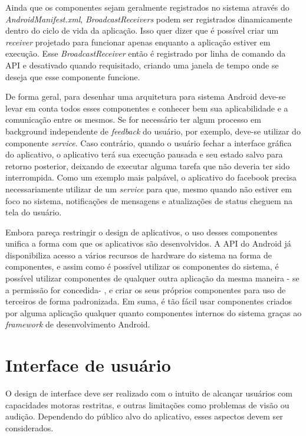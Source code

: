 \begin{apendicesenv}
Ainda que os componentes sejam geralmente registrados no sistema através do \textit{AndroidManifest.xml}, \textit{BroadcastReceivers} podem ser registrados dinamicamente dentro do ciclo de vida da aplicação. Isso quer dizer que é possível criar um \textit{receiver} projetado para funcionar apenas enquanto a aplicação estiver em execução. Esse \textit{BroadcastReceiver} então é registrado por linha de comando da API e desativado quando requisitado, criando uma janela de tempo onde se deseja que esse componente funcione.

De forma geral, para desenhar uma arquitetura para sistema Android deve-se levar em conta todos esses componentes e conhecer bem sua aplicabilidade e a comunicação entre os mesmos. Se for necessário ter algum processo em background independente de \textit{feedback} do usuário, por exemplo, deve-se utilizar do componente \textit{service}. Caso contrário, quando o usuário fechar a interface gráfica do aplicativo, o aplicativo terá sua execução pausada e seu estado salvo para retorno posterior, deixando de executar alguma tarefa que não deveria ter sido interrompida. Como um exemplo mais palpável, o aplicativo do facebook precisa necessariamente utilizar de um \textit{service} para que, mesmo quando não estiver em foco no sistema, notificações de mensagens e atualizações de status cheguem na tela do usuário.

Embora pareça restringir o design de aplicativos, o uso desses componentes unifica a forma com que os aplicativos são desenvolvidos. A API do Android já disponibiliza acesso a vários recursos de hardware do sistema na forma de componentes, e assim como é possível utilizar os componentes do sistema, é possível utilizar componentes de qualquer outra aplicação da mesma maneira - se a permissão for concedida- , e criar os seus próprios componentes para uso de terceiros de forma padronizada. Em suma, é tão fácil usar componentes criados por alguma aplicação qualquer quanto componentes internos do sistema graças ao \textit{framework} de desenvolvimento Android.

\section{Interface de usuário}

O design de interface deve ser realizado com o intuito de alcançar usuários com capacidades motoras restritas, e outras limitações como problemas de visão ou audição. Dependendo do público alvo do aplicativo, esses aspectos devem ser considerados.


\end{apendicesenv}
